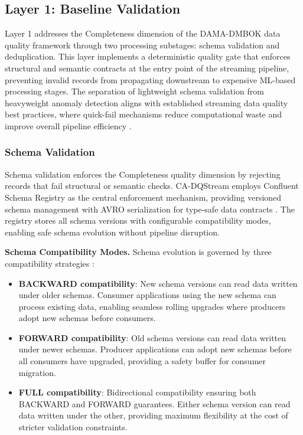 \subsection{Layer 1: Baseline Validation}

Layer 1 addresses the Completeness dimension of the DAMA-DMBOK data quality framework \citep{dama2017dmbok} through two processing substages: schema validation and deduplication. This layer implements a deterministic quality gate that enforces structural and semantic contracts at the entry point of the streaming pipeline, preventing invalid records from propagating downstream to expensive ML-based processing stages. The separation of lightweight schema validation from heavyweight anomaly detection aligns with established streaming data quality best practices, where quick-fail mechanisms reduce computational waste and improve overall pipeline efficiency \citep{confluent_dq_patterns}.

\subsubsection{Schema Validation}

Schema validation enforces the Completeness quality dimension by rejecting records that fail structural or semantic checks. CA-DQStream employs Confluent Schema Registry as the central enforcement mechanism, providing versioned schema management with AVRO serialization for type-safe data contracts \citep{confluent_schema_registry}. The registry stores all schema versions with configurable compatibility modes, enabling safe schema evolution without pipeline disruption.

\textbf{Schema Compatibility Modes.} Schema evolution is governed by three compatibility strategies \citep{confluent_schema_registry}:

\begin{itemize}
    \item \textbf{BACKWARD compatibility}: New schema versions can read data written under older schemas. Consumer applications using the new schema can process existing data, enabling seamless rolling upgrades where producers adopt new schemas before consumers.
    \item \textbf{FORWARD compatibility}: Old schema versions can read data written under newer schemas. Producer applications can adopt new schemas before all consumers have upgraded, providing a safety buffer for consumer migration.
    \item \textbf{FULL compatibility}: Bidirectional compatibility ensuring both BACKWARD and FORWARD guarantees. Either schema version can read data written under the other, providing maximum flexibility at the cost of stricter validation constraints.
\end{itemize}


